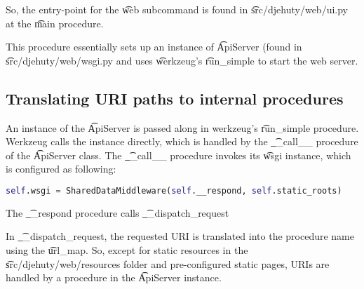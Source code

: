 So, the entry-point for the \t{web} subcommand is found in
\t{src/djehuty/web/ui.py} at the \t{main} procedure.

This procedure essentially sets up an instance of \t{ApiServer} (found in
\t{src/djehuty/web/wsgi.py} and uses \t{werkzeug}'s \t{run\_simple} to start
the web server.

\subsection{Translating URI paths to internal procedures}

An instance of the \t{ApiServer} is passed along in werkzeug's \t{run\_simple}
procedure.  Werkzeug calls the instance directly, which is handled by the
\t{\_\_call\_\_} procedure of the \t{ApiServer} class.  The \t{\_\_call\_\_} procedure
invokes its \t{wsgi} instance, which is configured as following:
\begin{lstlisting}[language=python]
self.wsgi = SharedDataMiddleware(self.__respond, self.static_roots)
\end{lstlisting}

The \t{\_\_respond} procedure calls \t{\_\_dispatch\_request}

In \t{\_\_dispatch\_request}, the requested URI is translated into the procedure
name using the \t{url\_map}.  So, except for static resources in the
\t{src/djehuty/web/resources} folder and pre-configured static pages, URIs are
handled by a procedure in the \t{ApiServer} instance.

